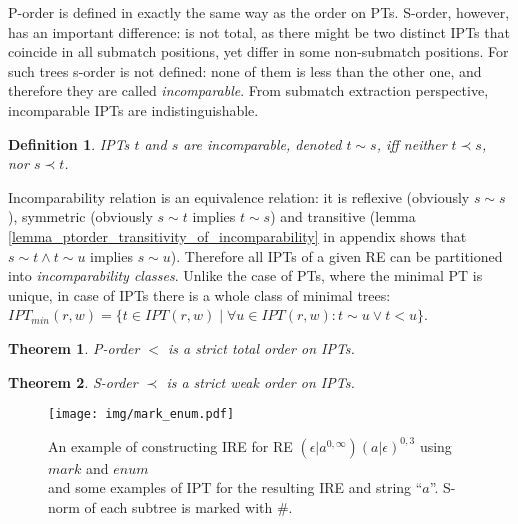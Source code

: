 \documentclass[AMA,STIX1COL]{WileyNJD-v2}
\newcommand{\IPT}{I\!PT}
\newtheorem{Xdef}{Definition}
\newtheorem{XThe}{Theorem}
\begin{document}
P-order is defined in exactly the same way as the order on PTs.
S-order, however, has an important difference: is not total, as
there might be two distinct IPTs that coincide in all submatch positions, yet differ in some non-submatch positions.
For such trees s-order is not defined: none of them is less than the other one,
and therefore they are called \emph{incomparable}.
From submatch extraction perspective, incomparable IPTs are indistinguishable.

    \begin{Xdef}\label{incomparable_IPTs}
    IPTs $t$ and $s$ are \emph{incomparable}, denoted $t \sim s$,
    iff neither $t \prec s$, nor $s \prec t$.
    \end{Xdef}

Incomparability relation is an equivalence relation: it is
reflexive (obviously $s \sim s$),
symmetric (obviously $s \sim t$ implies $t \sim s$) and
transitive (lemma \ref{lemma_ptorder_transitivity_of_incomparability} in appendix shows that $s \sim t \wedge t \sim u$ implies $s \sim u$).
Therefore all IPTs of a given RE can be partitioned into \emph{incomparability classes}.
%
Unlike the case of PTs, where the minimal PT is unique,
in case of IPTs there is a whole class of minimal trees:
$\IPT_{min}(r,w) = \{ t \in \IPT(r,w) \mid \forall u \in \IPT(r,w) : t \sim u \vee t < u \}$.


    \begin{XThe}\label{theorem_porder_on_IPTs}
    P-order $<$ is a strict total order on IPTs.
    \end{XThe}

    \begin{XThe}\label{theorem_sorder_on_IPTs}
    S-order $\prec$ is a strict weak order on IPTs.
    \end{XThe}

\begin{figure}\label{fig_mark_enum}
\texttt{[image: img/mark\_enum.pdf]}
\caption{
An example of constructing IRE for RE $(\epsilon|a^{0,\infty})(a|\epsilon)^{0,3}$ using $mark$ and $enum$\\
and some examples of IPT for the resulting IRE and string ``$a$''.
S-norm of each subtree is marked with $\#$.
}
\end{figure}
\end{document}
